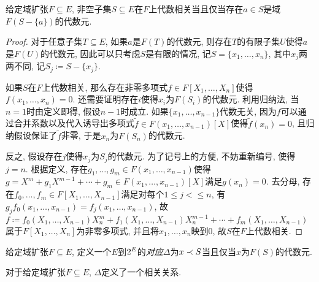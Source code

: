 \begin{proposition}\label{prop:algbdependcrit}
  给定域扩张$F\subseteq E$, 非空子集$S\subseteq E$在$F$上代数相关当且仅当存在$a\in S$是域$F(S-\{a\})$的代数元.
\end{proposition}

\begin{proof}
  对于任意子集$T\subseteq E$, 如果$a$是$F(T)$的代数元, 则存在$T$的有限子集$U$使得$a$是$F(U)$的代数元, 因此可以只考虑$S$是有限的情况, 记$S=\{x_1, \dotsc, x_n\}$, 其中$x_j$两两不同, 记$S_j\coloneq S-\{x_j\}$.

  如果$S$在$F$上代数相关, 那么存在非零多项式$f\in F[X_1, \dotsc, X_n]$使得$f(x_1, \dotsc, x_n)=0$. 还需要证明存在$i$使得$x_i$为$F(S_i)$的代数元. 利用归纳法, 当$n=1$时由定义即得, 假设$n-1$时成立. 如果$\{x_1, \dotsc, x_{n-1}\}$代数无关, 因为$f$可以通过合并系数以及代入诱导出多项式$\tilde{f}\in F(x_1, \dotsc, x_{n-1})[X]$使得$\tilde{f}(x_n)=0$, 且归纳假设保证了$\tilde{f}$非零, 于是$x_n$为$F(S_n)$的代数元.

  反之, 假设存在$j$使得$x_j$为$S_j$的代数元. 为了记号上的方便, 不妨重新编号, 使得$j=n$. 根据定义, 存在$g_1, \dotsc, g_m\in F(x_1, \dotsc, x_{n-1})$使得$g=X^m+g_1X^{m-1}+\dotsb+g_m\in F(x_1, \dotsc, x_{n-1})[X]$满足$g(x_n)=0$. 去分母, 存在$f_0, \dotsc, f_m\in F[X_1, \dotsc, X_{n-1}]$满足对每个$1\leq j<\leq n$, 有$g_jf_0(x_1, \dotsc, x_{n-1})=f_j(x_1, \dotsc, x_{n-1})$, 故$f\coloneq f_0(X_1, \dotsc, X_{n-1})X_n^m+f_1(X_1, \dotsc, X_{n-1})X_n^{m-1}+\dotsb+f_m(X_1, \dotsc, X_{n-1})$属于$F[X_1, \dotsc, X_n]$为非零多项式, 并且将$x_1, \dotsc, x_n$映到0, 故$S$在$F$上代数相关.
\end{proof}

给定域扩张$F\subseteq E$, 定义一个$E$到$2^{E}$的\emph{对应}$\Delta$为$x\prec S$当且仅当$x$为$F(S)$的代数元.
\begin{proposition}\label{prop:algbdependcorr}
  对于给定域扩张$F\subseteq E$, $\Delta$定义了一个相关关系.
\end{proposition}

